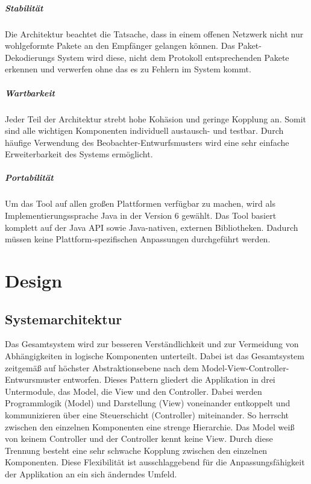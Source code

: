 \paragraph{Stabilität} Die Architektur beachtet die Tatsache, dass in einem
offenen Netzwerk nicht nur wohlgeformte Pakete an den Empfänger gelangen können.
Das Paket-Dekodierungs System wird diese, nicht dem Protokoll
entsprechenden Pakete erkennen und verwerfen ohne das es zu Fehlern im System
kommt.

\paragraph{Wartbarkeit} Jeder Teil der Architektur strebt hohe
Kohäsion und geringe Kopplung an. Somit sind alle wichtigen Komponenten
individuell austausch- und testbar. Durch häufige Verwendung des
Beobachter-Entwurfsmusters wird eine sehr einfache Erweiterbarkeit des Systems
ermöglicht.

\paragraph{Portabilität} Um das Tool auf allen großen Plattformen verfügbar zu
machen, wird als Implementierungssprache Java in der Version 6 gewählt. Das Tool
basiert komplett auf der Java API sowie Java-nativen, externen Bibliotheken.
Dadurch müssen keine Plattform-spezifischen Anpassungen durchgeführt werden.

%
%

\chapter{Design}

\section{Systemarchitektur}
\label{sec:7:sysarch}

Das Gesamtsystem wird zur besseren Verständlichkeit und zur Vermeidung von Abhängigkeiten 
in logische Komponenten unterteilt. Dabei ist das Gesamtsystem zeitgemäß auf höchster Abstraktionsebene nach dem Model-View-Controller-Entwursmuster entworfen. Dieses Pattern gliedert die Applikation in drei Untermodule, das Model, die View und den Controller.
Dabei werden Programmlogik (Model) und Darstellung (View) voneinander
entkoppelt und kommunizieren über eine Steuerschicht (Controller) miteinander.
So herrscht zwischen den einzelnen Komponenten eine strenge Hierarchie. Das Model weiß von keinem Controller und
der Controller kennt keine View. Durch diese Trennung besteht eine sehr schwache Kopplung zwischen den einzelnen
Komponenten. Diese Flexibilität ist ausschlaggebend für die Anpassungsfähigkeit der Applikation an ein sich änderndes Umfeld. 

